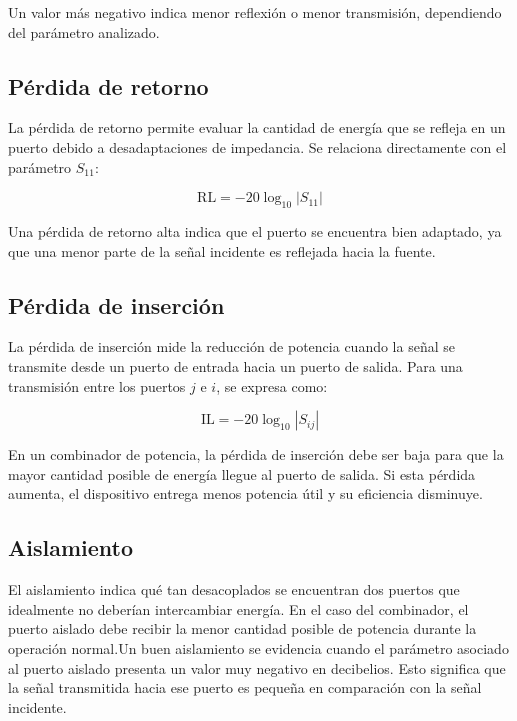 Un valor más negativo indica menor reflexión o menor transmisión, dependiendo del parámetro analizado.

\subsection{Pérdida de retorno}

La pérdida de retorno permite evaluar la cantidad de energía que se refleja en un puerto debido a desadaptaciones de impedancia. Se relaciona directamente con el parámetro $S_{11}$:

\begin{equation}
\text{RL} = -20\log_{10}\left|S_{11}\right|
\end{equation}

Una pérdida de retorno alta indica que el puerto se encuentra bien adaptado, ya que una menor parte de la señal incidente es reflejada hacia la fuente.

\subsection{Pérdida de inserción}

La pérdida de inserción mide la reducción de potencia cuando la señal se transmite desde un puerto de entrada hacia un puerto de salida. Para una transmisión entre los puertos $j$ e $i$, se expresa como:

\begin{equation}
\text{IL} = -20\log_{10}\left|S_{ij}\right|
\end{equation}

En un combinador de potencia, la pérdida de inserción debe ser baja para que la mayor cantidad posible de energía llegue al puerto de salida. Si esta pérdida aumenta, el dispositivo entrega menos potencia útil y su eficiencia disminuye.

\subsection{Aislamiento}

El aislamiento indica qué tan desacoplados se encuentran dos puertos que idealmente no deberían intercambiar energía. En el caso del combinador, el puerto aislado debe recibir la menor cantidad posible de potencia durante la operación normal.Un buen aislamiento se evidencia cuando el parámetro asociado al puerto aislado presenta un valor muy negativo en decibelios. Esto significa que la señal transmitida hacia ese puerto es pequeña en comparación con la señal incidente.

